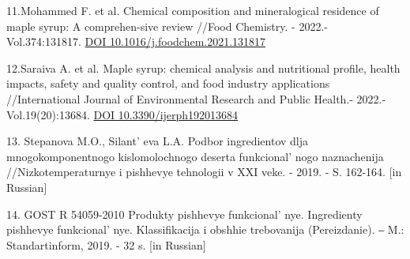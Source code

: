 \begin{references}
11.Mohammed F. et al. Chemical composition and mineralogical residence
of maple syrup: A comprehen-sive review //Food Chemistry. - 2022.-
Vol.374:131817.
\href{https://doi.org/10.1016/j.foodchem.2021.131817}{DOI
10.1016/j.foodchem.2021.131817}

12.Saraiva A. et al. Maple syrup: chemical analysis and nutritional
profile, health impacts, safety and quality control, and food industry
applications //International Journal of Environmental Research and
Public Health.- 2022.-Vol.19(20):13684.
\href{https://doi.org/10.3390/ijerph192013684}{DOI
10.3390/ijerph192013684}

13. Stepanova M.O., Silant' eva L.A. Podbor ingredientov
dlja mnogokomponentnogo kislomolochnogo deserta
funkcional' nogo naznachenija //Nizkotemperaturnye i
pishhevye tehnologii v XXI veke. - 2019. - S. 162-164. {[}in Russian{]}

14. GOST R 54059-2010 Produkty pishhevye funkcional' nye.
Ingredienty pishhevye funkcional' nye. Klassifikacija i
obshhie trebovanija (Pereizdanie). ‒ M.: Standartinform, 2019. - 32 s.
{[}in Russian{]}
\end{references}


